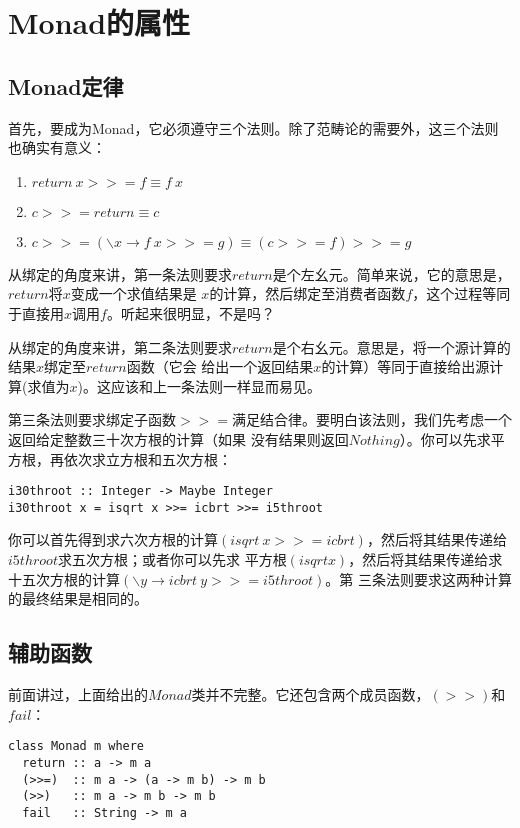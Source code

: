 \section{Monad的属性}
\subsection{Monad定律}
首先，要成为Monad，它必须遵守三个法则。除了范畴论的需要外，这三个法则也确实有意义：
\begin{enumerate}
\item $return\ x >>=  f \equiv f\ x$
\item $c >>= return \equiv c$
\item $c >>= (\backslash{}x \rightarrow f\ x >>= g) \equiv (c >>= f) >>= g$
\end{enumerate}

从绑定的角度来讲，第一条法则要求$return$是个左幺元。简单来说，它的意思是，$return$将$x$变成一个求值结果是
$x$的计算，然后绑定至消费者函数$f$，这个过程等同于直接用$x$调用$f$。听起来很明显，不是吗？

从绑定的角度来讲，第二条法则要求$return$是个右幺元。意思是，将一个源计算的结果$x$绑定至$return$函数（它会
给出一个返回结果$x$的计算）等同于直接给出源计算(求值为$x$)。这应该和上一条法则一样显而易见。

第三条法则要求绑定子函数$>>=$满足结合律。要明白该法则，我们先考虑一个返回给定整数三十次方根的计算（如果
没有结果则返回$Nothing$）。你可以先求平方根，再依次求立方根和五次方根：

\begin{lstlisting}
i30throot :: Integer -> Maybe Integer
i30throot x = isqrt x >>= icbrt >>= i5throot
\end{lstlisting}

你可以首先得到求六次方根的计算$(isqrt\ x >>= icbrt)$，然后将其结果传递给$i5throot$求五次方根；或者你可以先求
平方根$(isqrt x)$，然后将其结果传递给求十五次方根的计算$(\backslash{}y \rightarrow icbrt\ y >>= i5throot)$。第
三条法则要求这两种计算的最终结果是相同的。

\subsection{辅助函数}
前面讲过，上面给出的$Monad$类并不完整。它还包含两个成员函数，$(>>)$和$fail$：

\begin{lstlisting}
class Monad m where
  return :: a -> m a
  (>>=)  :: m a -> (a -> m b) -> m b
  (>>)   :: m a -> m b -> m b
  fail   :: String -> m a
\end{lstlisting}

